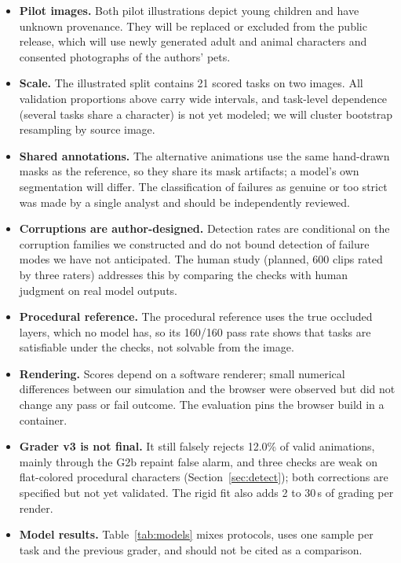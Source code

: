 \documentclass[11pt]{article}
\newcommand{\chk}[1]{\textsf{#1}}
\begin{document}
\begin{itemize}
\item \textbf{Pilot images.} Both pilot illustrations depict young children and have unknown provenance. They will be replaced or excluded from the public release, which will use newly generated adult and animal characters and consented photographs of the authors' pets.
\item \textbf{Scale.} The illustrated split contains 21 scored tasks on two images. All validation proportions above carry wide intervals, and task-level dependence (several tasks share a character) is not yet modeled; we will cluster bootstrap resampling by source image.
\item \textbf{Shared annotations.} The alternative animations use the same hand-drawn masks as the reference, so they share its mask artifacts; a model's own segmentation will differ. The classification of failures as genuine or too strict was made by a single analyst and should be independently reviewed.
\item \textbf{Corruptions are author-designed.} Detection rates are conditional on the corruption families we constructed and do not bound detection of failure modes we have not anticipated. The human study (planned, 600 clips rated by three raters) addresses this by comparing the checks with human judgment on real model outputs.
\item \textbf{Procedural reference.} The procedural reference uses the true occluded layers, which no model has, so its 160/160 pass rate shows that tasks are satisfiable under the checks, not solvable from the image.
\item \textbf{Rendering.} Scores depend on a software renderer; small numerical differences between our simulation and the browser were observed but did not change any pass or fail outcome. The evaluation pins the browser build in a container.
\item \textbf{Grader v3 is not final.} It still falsely rejects 12.0\% of valid animations, mainly through the \chk{G2b} repaint false alarm, and three checks are weak on flat-colored procedural characters (Section~\ref{sec:detect}); both corrections are specified but not yet validated. The rigid fit also adds 2 to 30\,s of grading per render.
\item \textbf{Model results.} Table~\ref{tab:models} mixes protocols, uses one sample per task and the previous grader, and should not be cited as a comparison.
\end{itemize}
\end{document}
